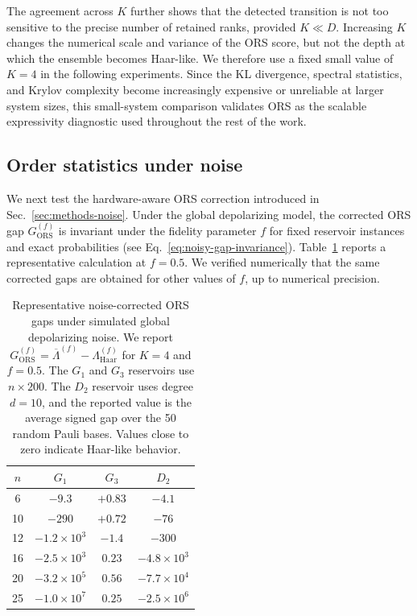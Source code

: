 \documentclass[
    aps,
    pre,
    amsmath,
    amssymb,
    reprint,
    superscriptaddress,
    preprintnumbers,
]{revtex4-2}
\begin{document}
The agreement across $K$ further shows that the detected transition is not too sensitive to the precise number of retained ranks, provided $K \ll D$. Increasing $K$ changes the numerical scale and variance of the ORS score, but not the depth at which the ensemble becomes Haar-like. We therefore use a fixed small value of $K = 4$ in the following experiments. Since the KL divergence, spectral statistics, and Krylov complexity become increasingly expensive or unreliable at larger system sizes, this small-system comparison validates ORS as the scalable expressivity diagnostic used throughout the rest of the work.


\subsection{Order statistics under noise}
\label{sec:results-noisy-ors}

We next test the hardware-aware ORS correction introduced in Sec.~\ref{sec:methods-noise}. Under the global depolarizing model, the corrected ORS gap $G_{\mathrm{ORS}}^{(f)}$ is invariant under the fidelity parameter $f$ for fixed reservoir instances and exact probabilities (see Eq.~\ref{eq:noisy-gap-invariance}). Table~\ref{tab:simulated-noise-invariance} reports a representative calculation at $f=0.5$. We verified numerically that the same corrected gaps are obtained for other values of $f$, up to numerical precision.
%
\begin{table}[t]
\centering
\begin{tabular}{c c c c}
\hline
$n$ & $G_1$ & $G_3$ & $D_2$ \\
\hline
6  & $-9.3$ & $+0.83$ & $-4.1$ \\
10 & $-290$ & $+0.72$ & $-76$ \\
12 & $-1.2\times 10^{3}$ & $-1.4$ & $-300$ \\
16 & $-2.5\times 10^{3}$ & $0.23$ & $-4.8\times 10^{3}$ \\
20 & $-3.2\times 10^{5}$ & $0.56$ & $-7.7\times 10^{4}$ \\
25 & $-1.0\times 10^{7}$ & $0.25$ & $-2.5\times 10^{6}$ \\
\hline
\end{tabular}
\caption{Representative noise-corrected ORS gaps under simulated global depolarizing noise. We report $G_{\mathrm{ORS}}^{(f)}=\overline{\Lambda}^{(f)}-\Lambda_{\mathrm{Haar}}^{(f)}$ for $K=4$ and $f=0.5$. The $G_1$ and $G_3$ reservoirs use $n \times 200$. The $D_2$ reservoir uses degree $d=10$, and the reported value is the average signed gap over the 50 random Pauli bases. Values close to zero indicate Haar-like behavior.}
\label{tab:simulated-noise-invariance}
\end{table}
\end{document}
